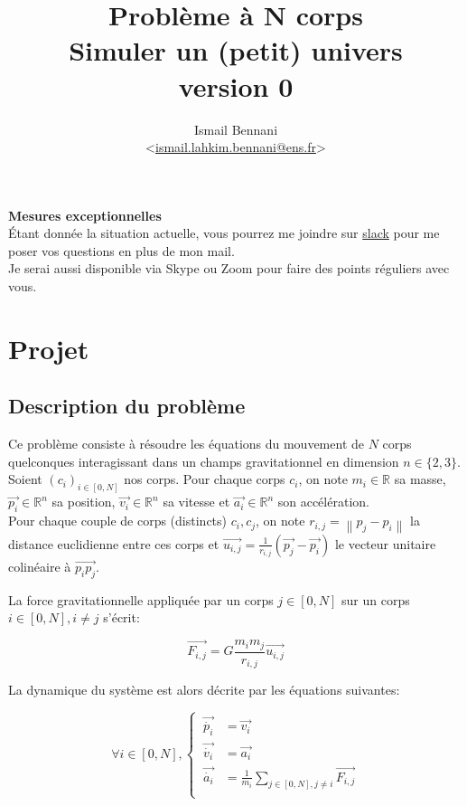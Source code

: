 \documentclass{article}
\title{\textbf{Problème à N corps} \\
       \Large Simuler un (petit) univers\\
       \small version 0}
\author{Ismail Bennani \\
        <\href{mailto:ismail.lahkim.bennani@ens.fr}{ismail.lahkim.bennani@ens.fr}>}
\newcommand{\norm}[1]{\left\lVert#1\right\rVert}
\begin{document}
\maketitle

\noindent\textbf{Mesures exceptionnelles}\\
Étant donnée la situation actuelle, vous pourrez me joindre sur \href{https://join.slack.com/t/in104n-bodyproblem/shared_invite/zt-cu07sew6-nw8ikZtOZBy2UmpqReQdWA}{slack} pour me poser vos questions en plus de mon mail.\\
Je serai aussi disponible via Skype ou Zoom pour faire des points réguliers avec vous.


\section{Projet}

\subsection{Description du problème}

Ce problème consiste à résoudre les équations du mouvement de $N$ corps quelconques interagissant dans un champs gravitationnel en dimension ${n\in \{ 2,3 \}}$.\\
Soient $(c_i)_{i\in[0,N]}$ nos corps. Pour chaque corps $c_i$, on note $m_i \in \mathbb{R}$ sa masse, $\overrightarrow{p_i} \in \mathbb{R}^n$ sa position, $\overrightarrow{v_i} \in \mathbb{R}^n$ sa vitesse et $\overrightarrow{a_i} \in \mathbb{R}^n$ son accélération.\\
Pour chaque couple de corps (distincts) $c_i, c_j$, on note $r_{i,j} = \norm{p_j - p_i}$ la distance euclidienne entre ces corps et $\overrightarrow{u_{i,j}} = \frac{1}{r_{i,j}}(\overrightarrow{p_j}-\overrightarrow{p_i})$ le vecteur unitaire colinéaire à $\overrightarrow{p_ip_j}$.

La force gravitationnelle appliquée par un corps $j \in [0,N]$ sur un corps $i \in [0,N], i \ne j$ s'écrit:

\begin{equation*}
    \overrightarrow{F_{i,j}} = G \frac{m_im_j}{r_{i,j}} \overrightarrow{u_{i,j}}
\end{equation*}

La dynamique du système est alors décrite par les équations suivantes:

\begin{equation*}
\forall i \in [0,N], \left\{\begin{aligned}
    \ \overrightarrow{\dot{p_i}} & = \overrightarrow{v_i} \\
    \ \overrightarrow{\dot{v_i}} & = \overrightarrow{a_i} \\
    \ \overrightarrow{\dot{a_i}} & = \frac{1}{m_i} \sum_{j \in [0,N], j \ne i} \overrightarrow{F_{i,j}} \\
\end{aligned}\right.
\end{equation*}
\end{document}
